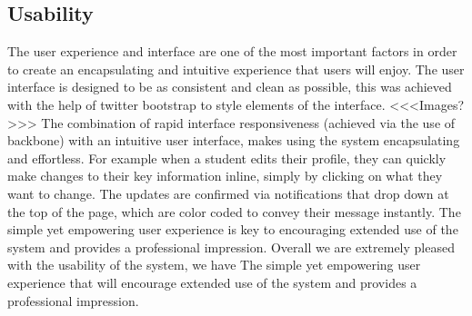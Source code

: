 \subsection{Usability}
The user experience and interface are one of the most important factors in order to create an encapsulating and intuitive experience that users will enjoy. The user interface is designed to be as consistent and clean as possible, this was achieved with the help of twitter bootstrap to style elements of the interface.
  <<<Images?>>>
The combination of rapid interface responsiveness (achieved via the use of backbone) with an intuitive user interface, makes using the system encapsulating and effortless. For example when a student edits their profile, they can quickly make changes to their key information inline, simply by clicking on what they want to change. The updates are confirmed via notifications that drop down at the top of the page, which are color coded to convey their message instantly. The simple yet empowering user experience is key to encouraging extended use of the system and provides a professional impression. Overall we are extremely pleased with the usability of the system, we have The simple yet empowering user experience that will encourage extended use of the system and provides a professional impression. 
